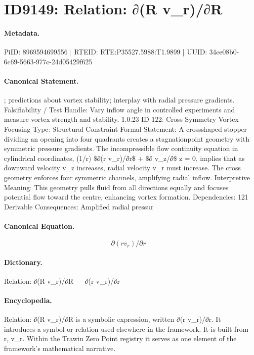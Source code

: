 \section*{ID9149: Relation: ∂(R v\_r)/∂R}
\paragraph{Metadata.}
PiID: 8969594699556 | RTEID: RTE:P35527.5988:T1.9899 | UUID: 34ce08b0-6c69-5663-977c-24d05429f625

\paragraph{Canonical Statement.}
; predictions about vortex stability; interplay with radial pressure gradients. Falsifiability / Test Handle: Vary inflow angle in controlled experiments and measure vortex strength and stability. 1.0.23 ID 122: Cross Symmetry Vortex Focusing Type: Structural Constraint Formal Statement: A crossshaped stopper dividing an opening into four quadrants creates a stagnationpoint geometry with symmetric pressure gradients. The incompressible flow continuity equation in cylindrical coordinates, (1/r) \$∂(r v\_r)/∂r\$ + \$∂ v\_z/∂\$ z = 0, implies that as downward velocity v\_z increases, radial velocity v\_r must increase. The cross geometry enforces four symmetric channels, amplifying radial inflow. Interpretive Meaning: This geometry pulls fluid from all directions equally and focuses potential flow toward the centre, enhancing vortex formation. Dependencies: 121 Derivable Consequences: Amplified radial pressur

\paragraph{Canonical Equation.}
\[
∂(r v_r)/∂r
\]

\paragraph{Dictionary.}
Relation: ∂(R v\_r)/∂R — ∂(r v\_r)/∂r

\paragraph{Encyclopedia.}
Relation: ∂(R v\_r)/∂R is a symbolic expression, written ∂(r v\_r)/∂r. It introduces a symbol or relation used elsewhere in the framework. It is built from r, v\_r. Within the Trawin Zero Point registry it serves as one element of the framework's mathematical narrative.
